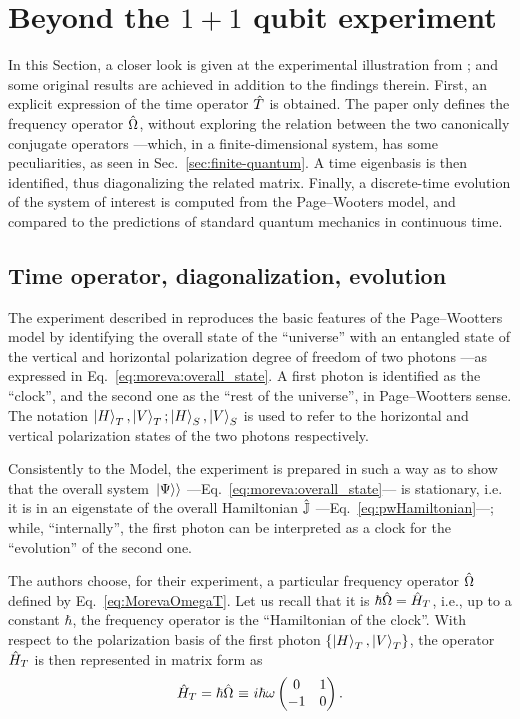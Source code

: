 \section{Beyond the $1+1$ qubit experiment}\label{sec:beyondMoreva}

In this Section, a closer look is given at the experimental illustration from \cite{Moreva:illustration};
and some original results are achieved in addition to the findings therein.
%
First, an explicit expression of the time operator $\hat{T}$
is obtained.
The \mbox{paper} \parencite{Moreva:illustration}
only defines the frequency operator $\hat{\Omega}$,
without exploring the relation between the two canonically conjugate operators
---which, in a finite-dimensional system, has some peculiarities, as seen in Sec.~\ref{sec:finite-quantum}.
%
A time eigenbasis is then identified, thus diagonalizing the related matrix.
%
Finally, a discrete-time evolution of the system of interest is computed from the Page--Wooters model,
and compared to the predictions of
standard quantum mechanics in continuous time.

\subsection{Time operator, diagonalization, evolution}
\label{1qubitExp}

The experiment described in \citereset\cite{Moreva:illustration}
reproduces the basic features of the Page--Wootters model
by identifying the overall state of the ``universe'' with an entangled state of the vertical
and
horizontal polarization degree of freedom of two photons
---as expressed in Eq.~\eqref{eq:moreva:overall_state}.
A {first} photon is identified as the ``clock'',
and the {second} one as the ``rest of the universe'',
in Page--Wootters sense.
The notation $\ket{H}_T, \ket{V}_T; \ket{H}_S, \ket{V}_S$
is used to refer to the horizontal and vertical polarization states of the two photons respectively.

Consistently to the Model, the experiment is prepared in such a way
as to show that the overall system $\left.\left| \Psi \right\rangle\right\rangle$ ---Eq.~\eqref{eq:moreva:overall_state}---
is stationary,
i.e. it is in an eigenstate of the overall Hamiltonian $\hat{\mathbb{J}}$ ---Eq.~\eqref{eq:pwHamiltonian}---;
while, ``internally'', the first photon can be interpreted as a clock for the ``evolution'' of the second one.

The authors choose, for their experiment,
a particular
frequency operator $\hat{\Omega}$
defined by Eq.~\eqref{eq:MorevaOmegaT}.
Let us recall that it is $\hbar\hat{\Omega} = \hat{H}_T$,
i.e., up to a constant $\hbar$, the frequency operator is the ``Hamiltonian of the clock''.
With respect to the polarization basis of the first photon
$\qty{\ket{H}_T, \ket{V}_T}$,
the operator $\hat{H}_T$ is then represented in matrix form as
\begin{equation}\label{eq:H_T}
  \hat{H}_T = \hbar\hat{\Omega} \operatorname*{\,\equiv\,} {
    i\hbar\omega
    \begin{pmatrix}
      0 & 1 \\
     -1 & 0
    \end{pmatrix}
  } \, \text{.}
\end{equation}

